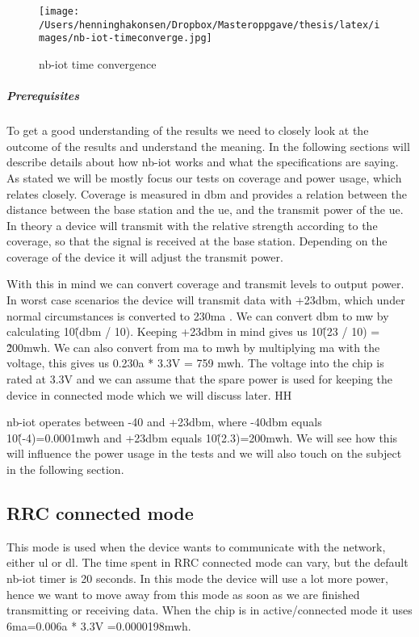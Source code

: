 \documentclass[USenglish]{ifimaster}  %
\begin{document}
\begin{figure}[ht]
  \centering\texttt{[image: /Users/henninghakonsen/Dropbox/Masteroppgave/thesis/latex/images/nb-iot-timeconverge.jpg]}
  \caption{\acrshort{nb-iot} time convergence \cite{person:ola}}
  \label{figure:nb-iot-timeconverge}
\end{figure}

\subparagraph{Prerequisites}
To get a good understanding of the results we need to closely look at the outcome of the results and understand the meaning. In the following sections will describe details about how \acrshort{nb-iot} works and what the specifications are saying. As stated we will be mostly focus our tests on coverage and power usage, which relates closely. Coverage is measured in \acrfull{dbm} and provides a relation between the distance between the base station and the \acrshort{ue}, and the transmit power of the \acrshort{ue}. In theory a device will transmit with the relative strength according to the coverage, so that the signal is received at the base station. Depending on the coverage of the device it will adjust the transmit power.

With this in mind we can convert coverage and transmit levels to output power. In worst case scenarios the device will transmit data with +23\acrshort{dbm}, which under normal circumstances is converted to 230\acrshort{ma} \cite{datasheet:ubloxchip}. We can convert \acrshort{dbm} to \acrshort{mw} by calculating 10\^(\acrshort{dbm} / 10). Keeping +23\acrshort{dbm} in mind gives us 10\^(23 / 10) = \~200\acrfull{mwh}. We can also convert from \acrshort{ma} to \acrshort{mwh} by multiplying \acrshort{ma} with the voltage, this gives us 0.230\acrfull{a} * 3.3V = 759 \acrshort{mwh}. The voltage into the chip is rated at 3.3V and we can assume that the spare power is used for keeping the device in connected mode which we will discuss later. HH

\acrshort{nb-iot} operates between -40 and +23\acrshort{dbm}, where -40\acrshort{dbm} equals 10\^(-4)=0.0001\acrshort{mwh} and +23\acrshort{dbm} equals 10\^(2.3)=200\acrshort{mwh}. We will see how this will influence the power usage in the tests and we will also touch on the subject in the following section.

\subsection{RRC connected mode} \label{ssection:rrc}
This mode is used when the device wants to communicate with the network, either \acrshort{ul} or \acrshort{dl}. The time spent in RRC connected mode can vary, but the default \acrshort{nb-iot} timer is 20 seconds. In this mode the device will use a lot more power, hence we want to move away from this mode as soon as we are finished transmitting or receiving data. When the chip is in active/connected mode it uses 6\acrshort{ma}=0.006\acrshort{a} * 3.3V =0.0000198\acrshort{mwh}.
\end{document}
